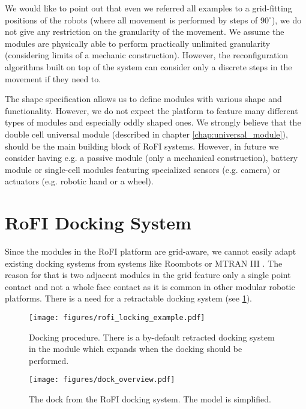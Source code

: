 We would like to point out that even we referred all examples to a grid-fitting
positions of the robots (where all movement is performed by steps of
$90^\circ$), we do not give any restriction on the granularity of the movement.
We assume the modules are physically able to perform practically unlimited
granularity (considering limits of a mechanic construction). However, the
reconfiguration algorithms built on top of the system can consider only a
discrete steps in the movement if they need to.

The shape specification allows us to define modules with various shape and
functionality. However, we do not expect the platform to feature many different
types of modules and especially oddly shaped ones. We strongly believe that the
double cell universal module (described in chapter \ref{chap:universal_module}),
should be the main building block of RoFI systems. However, in future we
consider having e.g. a passive module (only a mechanical construction), battery
module or single-cell modules featuring specialized sensors (e.g. camera) or
actuators (e.g. robotic hand or a wheel).

\section{RoFI Docking System}\label{sec:dock}

Since the modules in the RoFI platform are grid-aware, we cannot easily adapt
existing docking systems from systems like Roombots
\cite{bonardi_locomotion_2012} or MTRAN III \cite{kurokawa_distributed_2008}.
The reason for that is two adjacent modules in the grid feature only a single
point contact and not a whole face contact as it is common in other modular
robotic platforms. There is a need for a retractable docking system (see
\ref{fig:rofi_locking_example}).

\begin{figure}[t]
    \centering
    \texttt{[image: figures/rofi\_locking\_example.pdf]}
    \caption{Docking procedure. There is a by-default retracted docking system
    in the module which expands when the docking should be performed.}
    \label{fig:rofi_locking_example}
\end{figure}


\begin{figure}[t]
    \centering
    \texttt{[image: figures/dock\_overview.pdf]}
    \caption{The dock from the RoFI docking system. The model is simplified.}
    \label{fig:dock_overview}
\end{figure}


